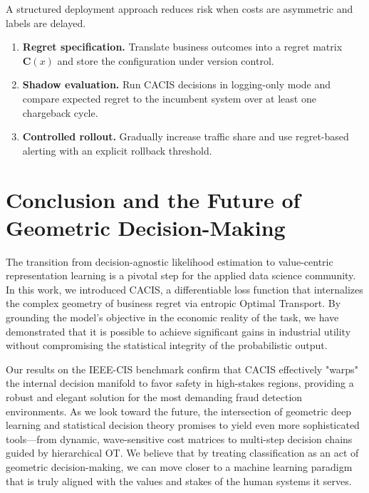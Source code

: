 \documentclass[sigconf,anonymous]{acmart}
\newcommand{\CACIS}{\textsc{CACIS}}
\newcommand{\mC}{\mathbf{C}}
\begin{document}
A structured deployment approach reduces risk when costs are asymmetric and labels are delayed.
\begin{enumerate}[leftmargin=1.2em, itemsep=0.2em, topsep=0.2em]
  \item \textbf{Regret specification.} Translate business outcomes into a regret matrix $\mC(x)$ and store the configuration under version control.
  \item \textbf{Shadow evaluation.} Run \CACIS{} decisions in logging-only mode and compare expected regret to the incumbent system over at least one chargeback cycle.
  \item \textbf{Controlled rollout.} Gradually increase traffic share and use regret-based alerting with an explicit rollback threshold.
\end{enumerate}

\section{Conclusion and the Future of Geometric Decision-Making}
The transition from decision-agnostic likelihood estimation to value-centric representation learning is a pivotal step for the applied data science community. In this work, we introduced \CACIS{}, a differentiable loss function that internalizes the complex geometry of business regret via entropic Optimal Transport. By grounding the model's objective in the economic reality of the task, we have demonstrated that it is possible to achieve significant gains in industrial utility without compromising the statistical integrity of the probabilistic output.

Our results on the IEEE-CIS benchmark confirm that \CACIS{} effectively "warps" the internal decision manifold to favor safety in high-stakes regions, providing a robust and elegant solution for the most demanding fraud detection environments. As we look toward the future, the intersection of geometric deep learning and statistical decision theory promises to yield even more sophisticated tools—from dynamic, wave-sensitive cost matrices to multi-step decision chains guided by hierarchical OT. We believe that by treating classification as an act of geometric decision-making, we can move closer to a machine learning paradigm that is truly aligned with the values and stakes of the human systems it serves.

\appendix
\end{document}
